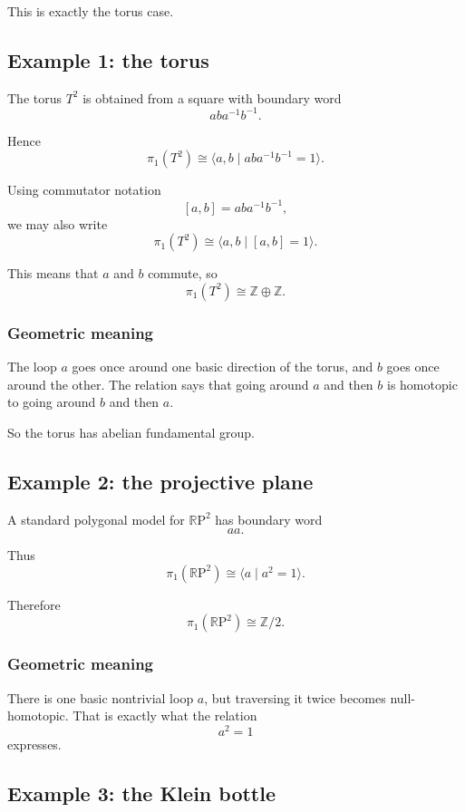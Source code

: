 \documentclass[12pt,a4paper]{article}
\newcommand{\RP}{\mathbb{R}\mathrm{P}}
\newcommand{\Z}{\mathbb{Z}}
\theoremstyle{notespace}
\begin{document}
This is exactly the torus case.

\subsection{Example 1: the torus}

The torus \(T^2\) is obtained from a square with boundary word
\[
aba^{-1}b^{-1}.
\]

Hence
\[
\pi_1(T^2)\cong \langle a,b\mid aba^{-1}b^{-1}=1\rangle.
\]

Using commutator notation
\[
[a,b]=aba^{-1}b^{-1},
\]
we may also write
\[
\pi_1(T^2)\cong \langle a,b\mid [a,b]=1\rangle.
\]

This means that \(a\) and \(b\) commute, so
\[
\pi_1(T^2)\cong \Z\oplus \Z.
\]

\subsubsection*{Geometric meaning}

The loop \(a\) goes once around one basic direction of the torus, and \(b\) goes once around the other. The relation says that going around \(a\) and then \(b\) is homotopic to going around \(b\) and then \(a\).

So the torus has abelian fundamental group.

\subsection{Example 2: the projective plane}

A standard polygonal model for \(\RP^2\) has boundary word
\[
aa.
\]

Thus
\[
\pi_1(\RP^2)\cong \langle a\mid a^2=1\rangle.
\]

Therefore
\[
\pi_1(\RP^2)\cong \Z/2.
\]

\subsubsection*{Geometric meaning}

There is one basic nontrivial loop \(a\), but traversing it twice becomes null-homotopic. That is exactly what the relation
\[
a^2=1
\]
expresses.

\subsection{Example 3: the Klein bottle}
\end{document}
